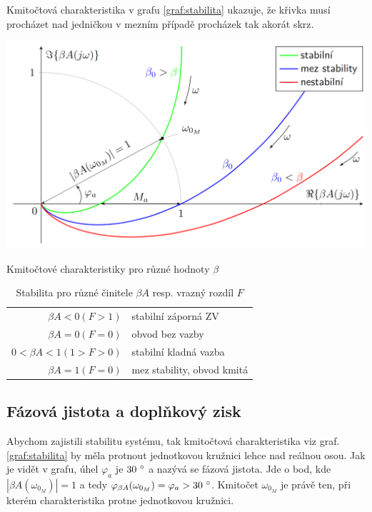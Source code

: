 \documentclass[a4paper,12pt]{article}   %
\begin{document}
Kmitočtová charakteristika v grafu \ref{graf:stabilita} ukazuje, že křivka musí procházet nad jedničkou v mezním případě procházek tak akorát skrz.
\begin{graf}
    \centering
    \includegraphics[width=.6\textwidth]{stabilita_vice.PNG}
    \caption{Kmitočtové charakteristiky pro různé hodnoty $\beta$}
    \label{graf:stabilita}
\end{graf}

\begin{table}
    \centering
    \begin{tabular}{rl}
        $\beta A < 0 (F>1)$ & stabilní záporná ZV\\
        $\beta A = 0 (F=0)$ & obvod bez vazby \\
        $0 < \beta A < 1(1>F>0)$&stabilní kladná vazba\\
        $\beta A = 1 (F=0)$ & mez stability, obvod kmitá\\
    \end{tabular}
    \caption{Stabilita pro různé činitele $\beta A$ resp. vrazný rozdíl $F$}
    \label{tab:stabilita}
\end{table}

\subsection*{Fázová jistota a doplňkový zisk}
Abychom zajistili stabilitu systému, tak kmitočtová charakteristika viz graf. \ref{graf:stabilita} by měla protnout jednotkovou kružnici lehce nad reálnou osou. Jak je vidět v grafu, úhel $\varphi_a$ je $30~\degree$ a nazývá se fázová jistota. Jde o bod, kde $|\beta A(\omega_{0_M})| = 1$ a tedy $\varphi_{\beta A}(\omega_{0_M}) = \varphi_a > 30~\degree$. Kmitočet $\omega_{0_M}$ je právě ten, při kterém charakteristika protne jednotkovou kružnici.
\end{document}
